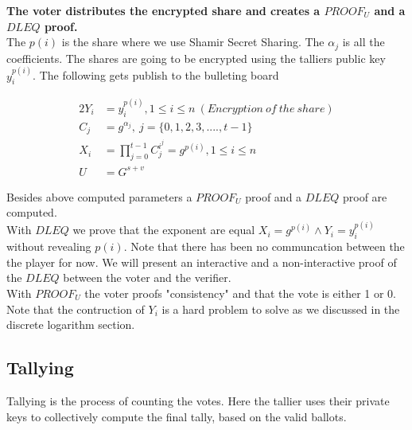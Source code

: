 \noindent
\textbf{The voter distributes the encrypted share and creates a $PROOF_U$ and a $DLEQ$ proof.}\\
The \begin{math}p(i)\end{math} is the share where we use Shamir Secret Sharing. The \begin{math}\alpha_j\end{math} is all the coefficients. The shares are going to be encrypted using the talliers public key $y_i^{p(i)}$. The following gets publish to the bulleting board

\begin{alignat*}{2}
Y_i&=y_i^{p(i)} ,1\leq i\leq n \ (Encryption \ of \ the \ share) \\ 
C_j&=g^{\alpha_j},\ j =\{0,1,2,3,....,t-1 \}  \\ 
X_i&=\prod\limits_{j=0}^{t-1} C_j^{i^j} =g^{p(i)}, 1\leq i\leq n\\
U&=G^{s+v}
\end{alignat*}

\noindent
Besides above computed parameters a  $PROOF_U$ proof and a $DLEQ$ proof are computed. \\

\noindent
With $DLEQ$ we prove that the exponent are equal \begin{math}X_i=g^{p(i)}  \land Y_i=y_i^{p(i)} \end{math} without revealing \begin{math}{p(i)} \end{math}. Note that there has been no communcation between the the player for now. We will present an interactive and a non-interactive proof of the $DLEQ$ between the voter and the verifier.\\

\noindent
With \begin{math} PROOF_U \end{math} the voter proofs "consistency" and that the vote is either 1 or 0. Note that the contruction of $Y_i$ is a hard problem to solve as we discussed in the discrete logarithm section.




\subsection{Tallying}
Tallying is the process of counting the votes. Here the tallier uses their private keys to collectively compute the final tally, based on the valid ballots.\\



